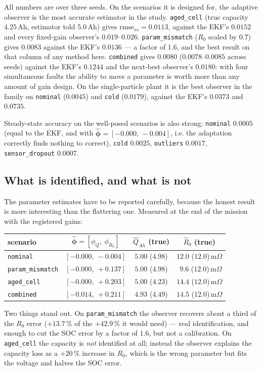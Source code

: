 All numbers are over three seeds.  On the scenarios it is designed for, the adaptive observer is
the most accurate estimator in the study.  \texttt{aged\_cell} (true capacity $4.25$\,Ah,
estimator told $5.0$\,Ah) gives $\mathrm{rmse}_{ss} = 0.0113$, against the EKF's $0.0152$ and
every fixed-gain observer's $0.019$--$0.026$.  \texttt{param\_mismatch} ($R_0$ scaled by $0.7$)
gives $0.0083$ against the EKF's $0.0136$ --- a factor of $1.6$, and the best result on that
column of any method here.  \texttt{combined} gives $0.0080$ ($0.0078$--$0.0085$ across seeds)
against the EKF's $0.1244$ and the next-best observer's $0.0180$: with four simultaneous faults
the ability to move a parameter is worth more than any amount of gain design.  On the
single-particle plant it is the best observer in the family on \texttt{nominal} ($0.0045$) and
\texttt{cold} ($0.0179$), against the EKF's $0.0373$ and $0.0735$.

Steady-state accuracy on the well-posed scenarios is also strong: \texttt{nominal} $0.0005$
(equal to the EKF, and with $\hat{\bm{\phi}} = [-0.000,\,-0.004]$, i.e. the adaptation correctly
finds nothing to correct), \texttt{cold} $0.0025$, \texttt{outliers} $0.0017$,
\texttt{sensor\_dropout} $0.0007$.

\subsection*{What is identified, and what is not}
\label{sec:ad-ident}
The parameter estimates have to be reported carefully, because the honest result is more
interesting than the flattering one.  Measured at the end of the mission with the registered
gains:
\begin{center}
\begin{tabular}{@{}lccc@{}}
\toprule
scenario & $\hat{\bm{\phi}} = [\phi_Q,\ \phi_{R_0}]$ & $\hat{Q}_{Ah}$ (true) & $\hat{R}_0$ (true) \\
\midrule
\texttt{nominal}        & $[-0.000,\ -0.004]$ & $5.00$ ($4.98$) & $12.0$ ($12.0$)\,m$\Omega$ \\
\texttt{param\_mismatch} & $[-0.000,\ +0.137]$ & $5.00$ ($4.98$) & $\ \,9.6$ ($12.0$)\,m$\Omega$ \\
\texttt{aged\_cell}      & $[-0.000,\ +0.203]$ & $5.00$ ($4.23$) & $14.4$ ($12.0$)\,m$\Omega$ \\
\texttt{combined}       & $[-0.014,\ +0.211]$ & $4.93$ ($4.49$) & $14.5$ ($12.0$)\,m$\Omega$ \\
\bottomrule
\end{tabular}
\end{center}
Two things stand out.  On \texttt{param\_mismatch} the observer recovers about a third of the
$R_0$ error ($+13.7\,\%$ of the $+42.9\,\%$ it would need) --- real identification, and enough to
cut the SOC error by a factor of $1.6$, but not a calibration.  On \texttt{aged\_cell} the
capacity is \emph{not} identified at all; instead the observer explains the capacity loss as a
$+20\,\%$ increase in $R_0$, which is the wrong parameter but fits the voltage and halves the SOC
error.

